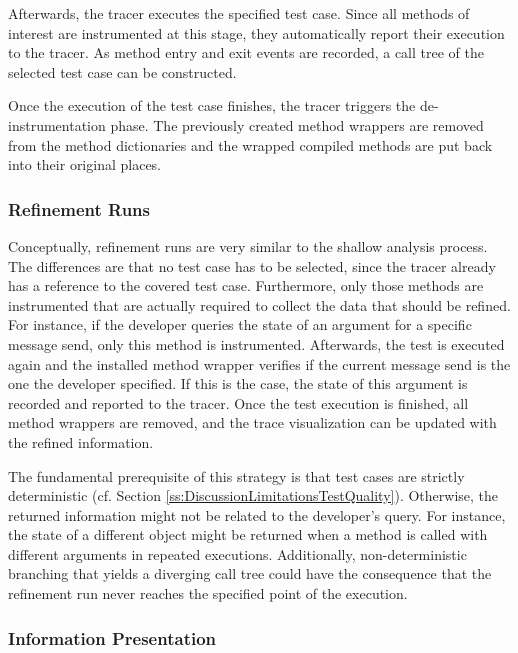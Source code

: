 Afterwards, the tracer executes the specified test case.
Since all methods of interest are instrumented at this stage, they automatically report their execution to the tracer.
As method entry and exit events are recorded, a call tree of the selected test case can be constructed.

Once the execution of the test case finishes, the tracer triggers the de-instrumentation phase.
The previously created method wrappers are removed from the method dictionaries and the wrapped compiled methods are put back into their original places.

\subsubsection{Refinement Runs}
Conceptually, refinement runs are very similar to the shallow analysis process.
The differences are that no test case has to be selected, since the tracer already has a reference to the covered test case.
Furthermore, only those methods are instrumented that are actually required to collect the data that should be refined.
For instance, if the developer queries the state of an argument for a specific message send, only this method is instrumented.
Afterwards, the test is executed again and the installed method wrapper verifies if the current message send is the one the developer specified.
If this is the case, the state of this argument is recorded and reported to the tracer.
Once the test execution is finished, all method wrappers are removed, and the trace visualization can be updated with the refined information.

The fundamental prerequisite of this strategy is that test cases are strictly deterministic (cf. Section \ref{ss:DiscussionLimitationsTestQuality}).
Otherwise, the returned information might not be related to the developer's query.
For instance, the state of a different object might be returned when a method is called with different arguments in repeated executions.
Additionally, non-deterministic branching that yields a diverging call tree could have the consequence that the refinement run never reaches the specified point of the execution.

\subsubsection{Information Presentation}

